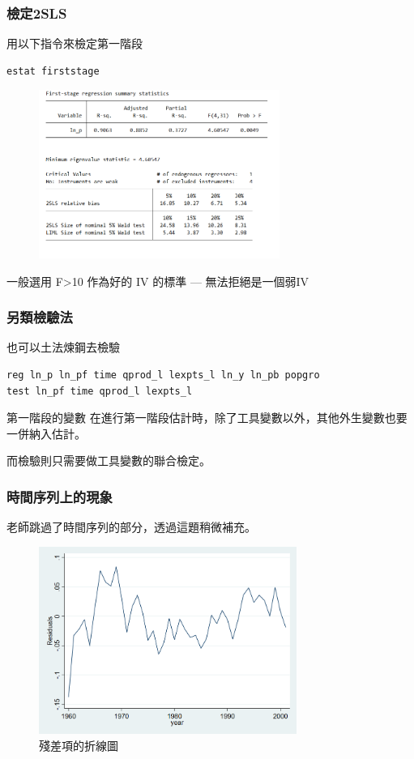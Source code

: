 \begin{frame}[fragile]
    \frametitle{檢定2SLS}
    用以下指令來檢定第一階段
\begin{lstlisting}
estat firststage \end{lstlisting}
    
    \begin{figure}
        \includegraphics[width=0.7\textwidth]{fig/result_11-11-e.png}
    \end{figure}
    一般選用 F>10 作為好的 IV 的標準 --- 無法拒絕是一個弱IV
\end{frame}


\begin{frame}[fragile]
    \frametitle{另類檢驗法}

    也可以土法煉鋼去檢驗
    \begin{lstlisting}
reg ln_p ln_pf time qprod_l lexpts_l ln_y ln_pb popgro 
test ln_pf time qprod_l lexpts_l \end{lstlisting}
    
        \begin{block}{第一階段的變數}
            在進行第一階段估計時，除了工具變數以外，其他外生變數也要一併納入估計。
            
            而檢驗則只需要做工具變數的聯合檢定。
        \end{block}
\end{frame}

\begin{frame}
    \frametitle{時間序列上的現象}
    老師跳過了時間序列的部分，透過這題稍微補充。

    \begin{figure}
        \includegraphics[width=0.75\textwidth]{../Results/11-11_AC.png}
        \caption{殘差項的折線圖}
    \end{figure}
    
\end{frame}

